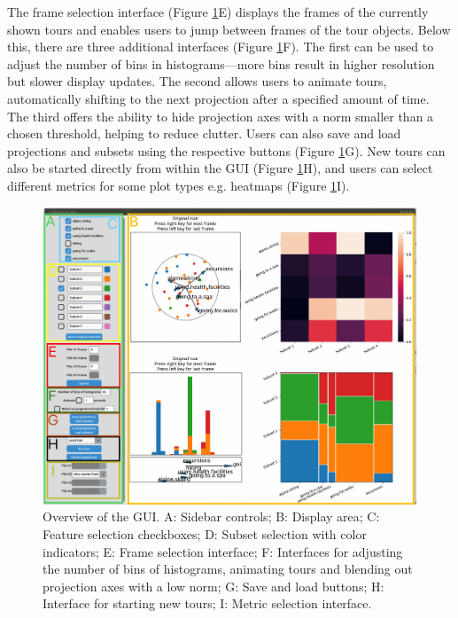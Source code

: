 \documentclass[article]{ajs}
\begin{document}
The frame selection interface (Figure \ref{fig:GUI_overview}E) displays the frames of the currently shown tours and enables users to jump between frames of the tour objects. Below this, there are three additional interfaces (Figure \ref{fig:GUI_overview}F). The first can be used to adjust the number of bins in histograms—more bins result in higher resolution but slower display updates. The second allows users to animate tours, automatically shifting to the next projection after a specified amount of time. The third offers the ability to hide projection axes with a norm smaller than a chosen threshold, helping to reduce clutter. Users can also save and load projections and subsets using the respective buttons (Figure \ref{fig:GUI_overview}G). New tours can also be started directly from within the GUI (Figure \ref{fig:GUI_overview}H), and users can select different metrics for some plot types e.g. heatmaps (Figure \ref{fig:GUI_overview}I).

\begin{figure}[h!]
    \centering
    \includegraphics[width=1\textwidth]{GUI_overview.pdf}
    \caption{Overview of the GUI. A: Sidebar controls; B: Display area; C: Feature selection checkboxes; D: Subset selection with color indicators; E: Frame selection interface; F: Interfaces for adjusting the number of bins of histograms, animating tours and blending out projection axes with a low norm; G: Save and load buttons; H: Interface for starting new tours; I: Metric selection interface.}
    \label{fig:GUI_overview}
\end{figure}
\end{document}
